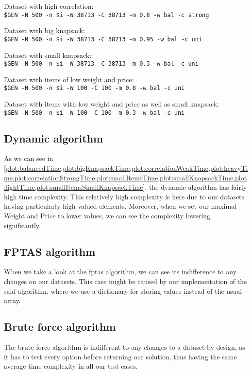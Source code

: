 Dataset with high correlation:\\
\texttt{\$GEN -N 500 -n \$i -W 38713 -C 38713 -m 0.8 -w bal -c strong}

Dataset with big knapsack:\\
\texttt{\$GEN -N 500 -n \$i -W 38713 -C 38713 -m 0.95 -w bal -c uni}

Dataset with small knapsack:\\
\texttt{\$GEN -N 500 -n \$i -W 38713 -C 38713 -m 0.3 -w bal -c uni}

Dataset with items of low weight and price:\\
\texttt{\$GEN -N 500 -n \$i -W 100 -C 100 -m 0.8 -w bal -c uni}

Dataset with items with low weight and price as well as small knapsack:\\
\texttt{\$GEN -N 500 -n \$i -W 100 -C 100 -m 0.3 -w bal -c uni}


\subsection{Dynamic algorithm}
As we can see in \cref{plot:balancedTime,plot:bigKnapsackTime,plot:correlationWeakTime,plot:heavyTime,plot:correlationStrongTime,plot:smallItemsTime,plot:smallKnapsackTime,plot:lightTime,plot:smallItemsSmallKnapsackTime},
the dynamic algorithm has fairly high time complexity. This relatively high complexity
is here due to our datasets having particularly high valued elements. Moreover, when we
set our maximal Weight and Price to lower values, we can see the complexity lowering significantly.

\subsection{FPTAS algorithm}
When we take a look at the fptas algorithm, we can see its indifference to any changes on our datasets.
This case might be caused by our implementation of the said algorithm, where we use a dictionary
for storing values instead of the usual array.

\subsection{Brute force algorithm}
The brute force algorithm is indifferent to any changes to a dataset by design, as it has to test
every option before returning our solution, thus having the same average time complexity in all
our test cases.

